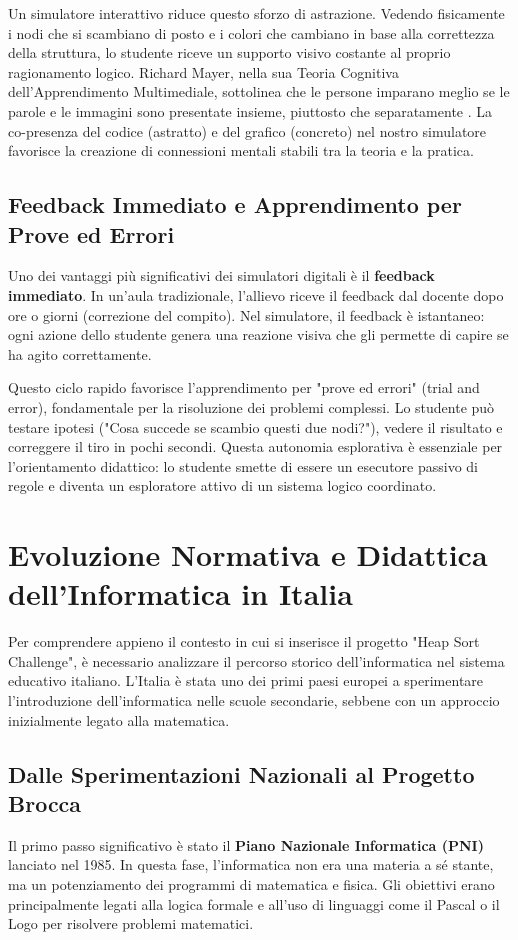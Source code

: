 \documentclass[openany]{theme/uniprthesis}
\begin{document}
Un simulatore interattivo riduce questo sforzo di astrazione. Vedendo fisicamente i nodi che si scambiano di posto e i colori che cambiano in base alla correttezza della struttura, lo studente riceve un supporto visivo costante al proprio ragionamento logico. Richard Mayer, nella sua Teoria Cognitiva dell'Apprendimento Multimediale, sottolinea che le persone imparano meglio se le parole e le immagini sono presentate insieme, piuttosto che separatamente \cite{mayer2005cognitive}. La co-presenza del codice (astratto) e del grafico (concreto) nel nostro simulatore favorisce la creazione di connessioni mentali stabili tra la teoria e la pratica.

\subsection{Feedback Immediato e Apprendimento per Prove ed Errori}
Uno dei vantaggi più significativi dei simulatori digitali è il \textbf{feedback immediato}. In un'aula tradizionale, l'allievo riceve il feedback dal docente dopo ore o giorni (correzione del compito). Nel simulatore, il feedback è istantaneo: ogni azione dello studente genera una reazione visiva che gli permette di capire se ha agito correttamente.

Questo ciclo rapido favorisce l'apprendimento per "prove ed errori" (trial and error), fondamentale per la risoluzione dei problemi complessi. Lo studente può testare ipotesi ("Cosa succede se scambio questi due nodi?"), vedere il risultato e correggere il tiro in pochi secondi. Questa autonomia esplorativa è essenziale per l'orientamento didattico: lo studente smette di essere un esecutore passivo di regole e diventa un esploratore attivo di un sistema logico coordinato.

\section{Evoluzione Normativa e Didattica dell'Informatica in Italia}
Per comprendere appieno il contesto in cui si inserisce il progetto "Heap Sort Challenge", è necessario analizzare il percorso storico dell'informatica nel sistema educativo italiano. L'Italia è stata uno dei primi paesi europei a sperimentare l'introduzione dell'informatica nelle scuole secondarie, sebbene con un approccio inizialmente legato alla matematica.

\subsection{Dalle Sperimentazioni Nazionali al Progetto Brocca}
Il primo passo significativo è stato il \textbf{Piano Nazionale Informatica (PNI)} lanciato nel 1985. In questa fase, l'informatica non era una materia a sé stante, ma un potenziamento dei programmi di matematica e fisica. Gli obiettivi erano principalmente legati alla logica formale e all'uso di linguaggi come il Pascal o il Logo per risolvere problemi matematici. 
\end{document}
